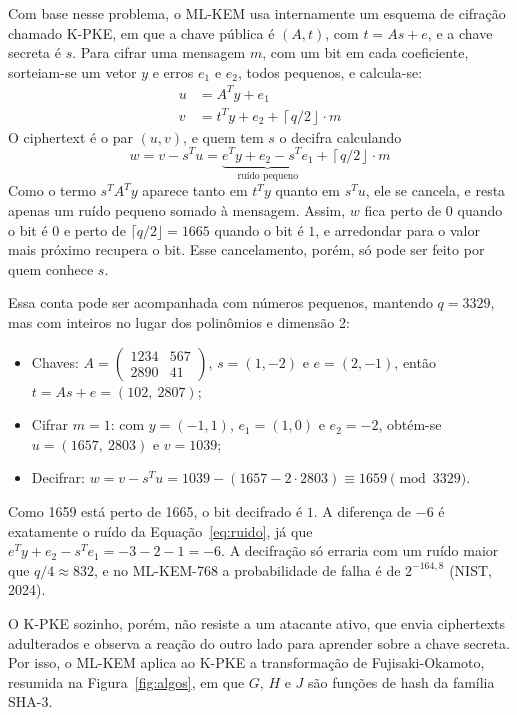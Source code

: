 \documentclass[12pt,a4paper]{article}
\begin{document}
Com base nesse problema, o ML-KEM usa internamente um esquema de cifração
chamado K-PKE, em que a chave pública é $(A, t)$, com $t = As + e$, e a
chave secreta é $s$. Para cifrar
uma mensagem $m$, com um bit em cada coeficiente, sorteiam-se um vetor $y$
e erros $e_1$ e $e_2$, todos pequenos, e calcula-se:
\begin{align}
u &= A^{T} y + e_1 \\
v &= t^{T} y + e_2 + \left\lceil q/2 \right\rfloor \cdot m
\end{align}
O ciphertext é o par $(u, v)$, e quem tem $s$ o decifra calculando
\begin{equation}
w = v - s^{T} u = \underbrace{e^{T} y + e_2 - s^{T} e_1}_{\text{ruído pequeno}} + \left\lceil q/2 \right\rfloor \cdot m
\label{eq:ruido}
\end{equation}
Como o termo $s^{T} A^{T} y$ aparece tanto em $t^{T} y$ quanto em
$s^{T} u$, ele se cancela, e resta apenas um ruído pequeno somado à
mensagem. Assim, $w$ fica perto de $0$ quando o bit é $0$ e perto de
$\lceil q/2 \rfloor = 1665$ quando o bit é $1$, e arredondar para o valor
mais próximo recupera o bit. Esse cancelamento, porém, só pode ser feito
por quem conhece $s$.

Essa conta pode ser acompanhada com números pequenos, mantendo $q = 3329$,
mas com inteiros no lugar dos polinômios e dimensão 2:
\begin{itemize}
  \item Chaves: $A = \begin{pmatrix} 1234 & 567 \\ 2890 & 41 \end{pmatrix}$,
  $s = (1, -2)$ e $e = (2, -1)$, então $t = As + e = (102,\ 2807)$;
  \item Cifrar $m = 1$: com $y = (-1, 1)$, $e_1 = (1, 0)$ e
  $e_2 = -2$, obtém-se $u = (1657,\ 2803)$ e $v = 1039$;
  \item Decifrar: $w = v - s^{T} u = 1039 - (1657 - 2 \cdot 2803)
  \equiv 1659 \pmod{3329}$.
\end{itemize}
Como 1659 está perto de 1665, o bit decifrado é $1$. A diferença de $-6$ é
exatamente o ruído da Equação~\eqref{eq:ruido}, já que
$e^{T} y + e_2 - s^{T} e_1 = -3 - 2 - 1 = -6$. A decifração só erraria com
um ruído maior que $q/4 \approx 832$, e no ML-KEM-768 a probabilidade de
falha é de $2^{-164{,}8}$ (NIST, 2024).



O K-PKE sozinho, porém, não resiste a um atacante ativo, que envia ciphertexts
adulterados e observa a reação do outro lado para aprender sobre a chave
secreta. Por isso, o ML-KEM aplica ao K-PKE a transformação de
Fujisaki-Okamoto, resumida na Figura~\ref{fig:algos}, em que
$G$, $H$ e $J$ são funções de hash da família SHA-3.
\end{document}
